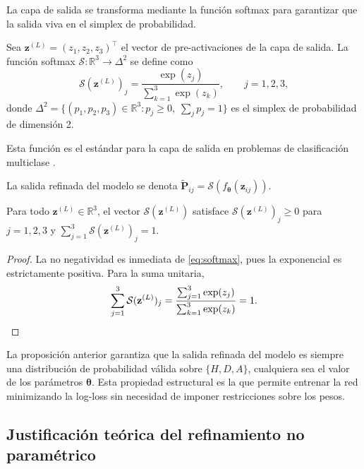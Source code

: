 La capa de salida se transforma mediante la funci\'on softmax para garantizar que la salida viva en el simplex de probabilidad.

\begin{definition}
	Sea $\mathbf{z}^{(L)} = (z_1, z_2, z_3)^\top$ el vector de pre-activaciones de la capa de salida. La funci\'on softmax $\mathcal{S}: \mathbb{R}^3 \to \Delta^2$ se define como
	\begin{equation}\label{eq:softmax}
		\mathcal{S}(\mathbf{z}^{(L)})_j = \frac{\exp(z_j)}{\sum_{k=1}^{3} \exp(z_k)}, \qquad j = 1, 2, 3,
	\end{equation}
	donde $\Delta^2 = \{(p_1,p_2,p_3) \in \mathbb{R}^3 : p_j \geq 0,\; \sum_j p_j = 1\}$ es el simplex de probabilidad de dimensi\'on 2.
	
	Esta funci\'on es el est\'andar para la capa de salida en problemas de clasificaci\'on multiclase \cite{Charu2018,solorzano2025rn}.
\end{definition}

La salida refinada del modelo se denota $\tilde{\mathbf{P}}_{ij} = \mathcal{S}(f_{\boldsymbol{\theta}}(\mathbf{z}_{ij}))$.

\begin{prop}
	Para todo $\mathbf{z}^{(L)} \in \mathbb{R}^3$, el vector $\mathcal{S}(\mathbf{z}^{(L)})$ satisface $\mathcal{S}(\mathbf{z}^{(L)})_j \geq 0$ para $j = 1, 2, 3$ y $\sum_{j=1}^{3} \mathcal{S}(\mathbf{z}^{(L)})_j = 1$.
\end{prop}

\begin{proof}
	La no negatividad es inmediata de \eqref{eq:softmax}, pues la exponencial es estrictamente positiva. Para la suma unitaria,
	\[
	\sum_{j=1}^{3} \mathcal{S}(\mathbf{z}^{(L)})_j
	= \frac{\sum_{j=1}^{3} \exp(z_j)}{\sum_{k=1}^{3} \exp(z_k)} = 1. \qedhere
	\]
\end{proof}

La proposici\'on anterior garantiza que la salida refinada del modelo es siempre una distribuci\'on de probabilidad v\'alida sobre $\{H,D,A\}$, cualquiera sea el valor de los par\'ametros $\boldsymbol{\theta}$. Esta propiedad estructural es la que permite entrenar la red minimizando la log-loss sin necesidad de imponer restricciones sobre los pesos.

\subsection{Justificaci\'on te\'orica del refinamiento no param\'etrico}
\label{subsec:mlp_justificacion}

